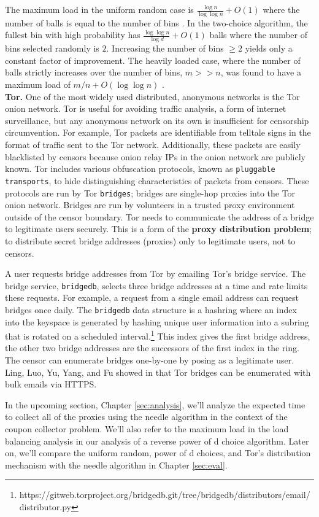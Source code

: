 The maximum load in the uniform random case is $\frac{\log n}{\log \log n} + O(1)$ where the number of balls is equal to the number of bins \cite{azar1999balanced}. In the two-choice algorithm, the fullest bin with high probability has $ \frac{\log \log n}{\log d} + O(1)$ balls where the number of bins selected randomly is $2$. Increasing the number of bins $\geq 2$ yields only a constant factor of improvement. The heavily loaded case, where the number of balls strictly increases over the number of bins, $m >> n$, was found to have a maximum load of $m/n + O(\log{\log{n}})$ \cite{berenbrink2000balanced}. \\

\textbf{Tor.} One of the most widely used distributed, anonymous networks is the Tor onion network. Tor is useful for avoiding traffic analysis, a form of internet surveillance, but any anonymous network on its own is insufficient for censorship circumvention. For example, Tor packets are identifiable from telltale signs in the format of traffic sent to the Tor network. Additionally, these packets are easily blacklisted by censors because onion relay IPs in the onion network are publicly known. Tor includes various obfuscation protocols, known as \texttt{pluggable transports}, to hide distinguishing characteristics of packets from censors. These protocols are run by Tor \texttt{bridges}; bridges are single-hop proxies into the Tor onion network. Bridges are run by volunteers in a trusted proxy environment outside of the censor boundary. Tor needs to communicate the address of a bridge to legitimate users securely. This is a form of the \textbf{proxy distribution problem}; to distribute secret bridge addresses (proxies) only to legitimate users, not to censors. 

A user requests bridge addresses from Tor by emailing Tor's bridge service. The bridge service, \texttt{bridgedb}, selects three bridge addresses at a time and rate limits these requests. For example, a request from a single email address can request bridges once daily. The \texttt{bridgedb} data structure is a hashring where an index into the keyspace is generated by hashing unique user information into a subring that is rotated on a scheduled interval.\footnote{https://gitweb.torproject.org/bridgedb.git/tree/bridgedb/distributors/email/distributor.py} This index gives the first bridge address, the other two bridge addresses are the successors of the first index in the ring. The censor can enumerate bridges one-by-one by posing as a legitimate user. Ling, Luo, Yu, Yang, and Fu showed in \cite{ling2015tor} that Tor bridges can be enumerated with bulk emails via HTTPS.

In the upcoming section, Chapter \ref{sec:analysis}, we'll analyze the expected time to collect all of the proxies using the needle algorithm in the context of the coupon collector problem. We'll also refer to the maximum load in the load balancing analysis in our analysis of a reverse power of d choice algorithm. Later on, we'll compare the uniform random, power of d choices, and Tor's distribution mechanism with the needle algorithm in Chapter \ref{sec:eval}.